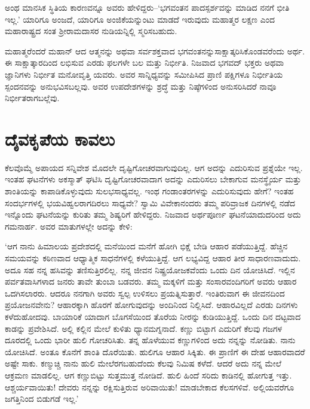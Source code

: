 ಅಂಥ ಮಾನಸಿಕ ಸ್ಥಿತಿಯ ಕಾರಣವನ್ನೂ ಅವರು ಹೇಳಿದ್ದರು–‘ಭಗವಂತನ ಪಾದಸ್ಪರ್ಶವನ್ನು ಮಾಡಿದ ನನಗೆ ಭೀತಿ ಇಲ್ಲ.’ ಯಾರಿಗೂ ಅಂಜದೆ, ಯಾರಿಗೂ ಅಂಜಿಕೆಯನ್ನುಂಟು ಮಾಡದೆ ಇರುವುದು ಮಹಾತ್ಮರ ಲಕ್ಷಣ ಎಂದ ಮಹಾರಾಷ್ಟ್ರದ ಸಂತ ಶ‍್ರೀರಾಮದಾಸರ ನುಡಿಯನ್ನಿಲ್ಲಿ ಸ್ಮರಿಸಬಹುದು.

ಮಹಾತ್ಮರೆಂದರೆ ಮಹಾನ್ ಆದ ಆತ್ಮನನ್ನು ಅಥವಾ ಸರ್ವಶಕ್ತವಾದ ಭಗವಂತನನ್ನು\break ಸಾಕ್ಷಾತ್ಕರಿಸಿಕೊಂಡವರೆಂದು ಅರ್ಥ. ಈ ಸಾಕ್ಷಾತ್ಕಾರದಿಂದ ಲಭಿಸುವ ಎರಡು ಫಲಗಳೇ ಬಲ ಮತ್ತು ನಿರ್ಭೀತಿ. ನಿಜವಾದ ಭಗವದ್ ಭಕ್ತರು ಅಥವಾ ಜ್ಞಾನಿಗಳು ನಿರ್ಭೀತ ಮನೋವೃತ್ತಿ ಯವರು. ಅವರ ಸಾನ್ನಿಧ್ಯವನ್ನು ಸಮೀಪಿಸಿದ ಪ್ರಾಣಿ ಪಕ್ಷಿಗಳೂ ನಿರ್ಭೀತಿಯ ಸ್ಪಂದನವನ್ನು ಅನುಭವಿಸಬಲ್ಲವು. ಅವರ ಉಪದೇಶಗಳನ್ನು ಶ್ರದ್ಧೆ ಮತ್ತು ನಿಷ್ಠೆಗಳಿಂದ ಅನುಸರಿಸಿದರೆ ನಾವೂ ನಿರ್ಭೀತರಾಗಬಲ್ಲೆವು.


\section*{ದೈವಕೃಪೆಯ ಕಾವಲು}

\vskip -7pt

ಕೆಲವೊಮ್ಮೆ ಅಪಾಯದ ಸನ್ನಿವೇಶ ಮೊದಲೇ ದೃಷ್ಟಿಗೋಚರವಾಗುವುದಿಲ್ಲ. ಆಗ ಅದನ್ನು ಎದುರಿಸುವ ಪ್ರಶ್ನೆಯೇ ಇಲ್ಲ. ಇಂತಹ ಘಟನೆಗಳು ಅಕಸ್ಮಾತ್ ಘಟಿಸಿ ದೃಷ್ಟಿಗೋಚರವಾದಾಗ ಅದನ್ನು ಎದುರಿಸಲು ಬೇಕಾಗುವ ಮನಸ್ಥೈರ್ಯ ಮತ್ತು ಶಾಂತಿಯನ್ನು ಕಾಪಾಡಿಕೊಳ್ಳುವುದು ಸುಲಭಸಾಧ್ಯವಲ್ಲ. ಇಂಥ ಗಂಡಾಂತರಗಳನ್ನು ಎದುರಿಸುವುದು ಹೇಗೆ? ಇಂತಹ ಸಂದರ್ಭಗಳಲ್ಲಿ ಭಯವಿಹ್ವಲರಾಗದಿರಲು ಸಾಧ್ಯವೇ? ಸ್ವಾಮಿ ವಿವೇಕಾನಂದರು ತಮ್ಮ ಪರಿವ್ರಾಜಕ ದಿನಗಳಲ್ಲಿ ನಡೆದ ಇನ್ನೊಂದು ಘಟನೆಯನ್ನು ಕುರಿತು ತಮ್ಮ ಶಿಷ್ಯರಿಗೆ ಹೇಳಿದ್ದರು. ನಿಜವಾದ ಅರ್ಥಪೂರ್ಣ ಘಟನೆಯಾದುದರಿಂದ ಅದು ಗಮನಾರ್ಹ. ಅವರ ಮಾತುಗಳಲ್ಲೇ ಅದನ್ನು ಕೇಳಿ:

‘ಆಗ ನಾನು ಹಿಮಾಲಯ ಪ್ರದೇಶದಲ್ಲಿ ಮನೆಯಿಂದ ಮನೆಗೆ ಹೋಗಿ ಭಿಕ್ಷೆ ಬೇಡಿ ಆಹಾರ ಪಡೆಯುತ್ತಿದ್ದೆ. ಹೆಚ್ಚಿನ ಸಮಯವನ್ನು ಕಠಿಣವಾದ ಆಧ್ಯಾತ್ಮಿಕ ಸಾಧನೆಗಳಲ್ಲಿ ಕಳೆಯುತ್ತಿದ್ದೆ. ಆಗ ಲಭ್ಯವಿದ್ದ ಆಹಾರ ತೀರ ಸಾಧಾರಣವಾದುದು. ಅದೂ ಸಹ ನನ್ನ ಹಸಿವನ್ನು ತಣಿಸುತ್ತಿರಲಿಲ್ಲ. ನನ್ನ ಜೀವನ ನಿಷ್ಪ್ರಯೋಜಕವೆಂದು ಒಂದು ದಿನ ಯೋಚಿಸಿದೆ. ಇಲ್ಲಿನ ಪರ್ವತವಾಸಿಗಳಾದ ಜನರು ತಾವೇ ತುಂಬಾ ಬಡವರು. ತಮ್ಮ ಮಕ್ಕಳಿಗೆ ಮತ್ತು ಸಂಸಾರವಂದಿಗರಿಗೆ ಅವರು ಆಹಾರ ಒದಗಿಸಲಾರರು. ಆದರೂ ನನಗಾಗಿ ಅವರು ಸ್ವಲ್ಪ ಉಳಿಸಲು ಪ್ರಯತ್ನಿಸುತ್ತಾರೆ. ಇಂತಿರುವಾಗ ಈ ಜೀವನದಿಂದ ಪ್ರಯೋಜನವೇನು? ಆಹಾರಕ್ಕಾಗಿ ಹೊರಗೆ ಹೋಗುವುದನ್ನು ಅಂದಿನಿಂದ ನಿಲ್ಲಿಸಿದೆ. ಆಹಾರವಿಲ್ಲದೆ ಎರಡು ದಿನಗಳು ಕಳೆದುಹೋದವು. ಬಾಯಾರಿಕೆ ಯಾದಾಗ ಬೊಗಸೆಯಿಂದ ತೊರೆಯ ನೀರನ್ನು ಕುಡಿಯುತ್ತಿದ್ದೆ. ಒಂದು ದಿನ ದಟ್ಟವಾದ ಕಾಡನ್ನು ಪ್ರವೇಶಿಸಿದೆ. ಅಲ್ಲಿ ಕಲ್ಲಿನ ಮೇಲೆ ಕುಳಿತು ಧ್ಯಾನಮಗ್ನನಾದೆ. ಕಣ್ಣು ಬಿಟ್ಟಾಗ ಎದುರಿಗೆ ಕೆಲವು ಗಜಗಳ ದೂರದಲ್ಲಿ ಒಂದು ಭಾರೀ ಹುಲಿ ಗೋಚರಿಸಿತು. ತನ್ನ ಹೊಳೆಯುವ ಕಣ್ಣುಗಳಿಂದ ಅದು ನನ್ನನ್ನು ನೋಡಿತು. ನಾನು ಯೋಚಿಸಿದೆ. ಅಂತೂ ಕೊನೆಗೆ ಶಾಂತಿ ದೊರೆಯಿತು. ಹುಲಿಗೂ ಆಹಾರ ಸಿಕ್ಕಿತು. ಈ ಪ್ರಾಣಿಗೆ ಈ ದೇಹ ಆಹಾರವಾದರೆ ಅಷ್ಟೇ ಸಾಕು. ಕಣ್ಮುಚ್ಚಿ ನಾನು ಹುಲಿ ಮೇಲೆರಗಬಹುದೆಂದು ಕೆಲವು ನಿಮಿಷ ಕಳೆದೆ. ಆದರೆ ಅದು ನನ್ನ ಮೇಲೆ ಆಕ್ರಮಣ ಮಾಡಲಿಲ್ಲ. ಆಗ ಕಣ್ಣುಬಿಟ್ಟು ಸುತ್ತಮುತ್ತ ನೋಡಿದೆ. ಹುಲಿ ಹಿಂದೆ ಸರಿದು ಕಾಡಿನಲ್ಲಿ ಹೋಗುತ್ತ ಇತ್ತು. ಆಶ್ಚರ್ಯವಾಯಿತು! ದೇವರು ನನ್ನನ್ನು ರಕ್ಷಿಸುತ್ತಿರುವ ಅರಿವಾಯಿತು! ಮಾಡಬೇಕಾದ ಕೆಲಸಗಳಿವೆ. ಅಲ್ಲಿಯವರೆಗೂ ಜಗತ್ತಿನಿಂದ ಬಿಡುಗಡೆ ಇಲ್ಲ.’


